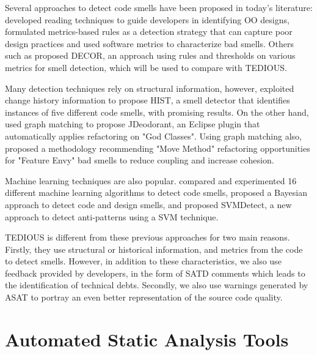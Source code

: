 Several approaches to detect code smells have been proposed in today's literature: \citet{Travassos99-ACM-Inspections} developed reading techniques to guide developers in identifying \ac{OO} designs, \citet{Marinescu04-ICSM-DetectionStrategies} formulated metrics-based rules as a detection strategy that can capture poor design practices and \citet{Munro05-BadSmellIdentification} used software metrics to characterize bad smells. Others such as \citet{moha2010decor} proposed \ac{DECOR}, an approach using rules and thresholds on various metrics for smell detection, which will be used to compare with TEDIOUS. 

Many detection techniques rely on structural information, however, \citet{PalombaBPOPL15} exploited change history information to propose \ac{HIST}, a smell detector that identifies instances of five different code smells, with promising results. On the other hand, \citet{FokaefsTSC11} used graph matching to propose JDeodorant, an Eclipse plugin that automatically applies refactoring on "God Classes". Using graph matching also, \citet{Tsantalis:tse2009} proposed a methodology recommending "Move Method" refactoring opportunities for "Feature Envy" bad smells to reduce coupling and increase cohesion. 

Machine learning techniques are also popular. \citet{fontana2016comparing} compared and experimented 16 different machine learning algorithms to detect code smells, \citet{khomh2009bayesian} proposed a Bayesian approach to detect code and design smells, and \citet{maiga2012support} proposed SVMDetect, a new approach to detect anti-patterns using a \ac{SVM} technique. \par 

TEDIOUS is different from these previous approaches for two main reasons. Firstly, they use structural or historical information, and metrics from the code to detect smells. However, in addition to these characteristics, we also use feedback provided by developers, in the form of \ac{SATD} comments which leads to the identification of technical debts. Secondly, we also use warnings generated by \ac{ASAT} to portray an even better representation of the source code quality. \par 

\section{Automated Static Analysis Tools}

